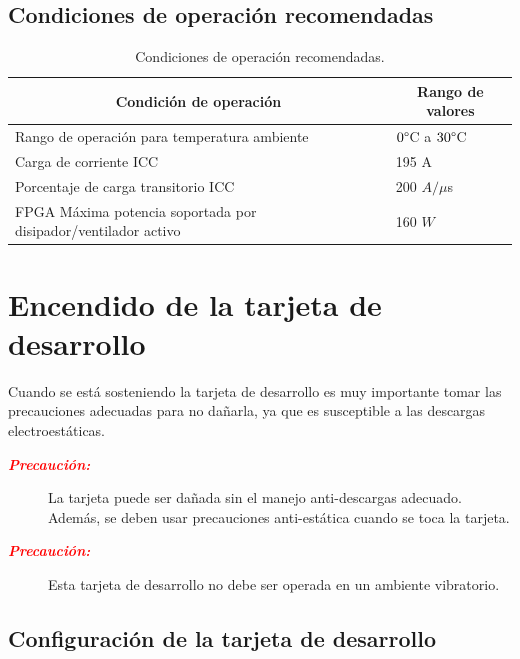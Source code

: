 \subsection{Condiciones de operaci\'on recomendadas}

\begin{table}[H]
    \centering
    \begin{tabularx}{\linewidth}{l|X}
        \toprule 
        \multicolumn{1}{c}{\textbf{Condición de operación}} & \multicolumn{1}{c}{\textbf{Rango de valores}} \\
        \toprule
        Rango de operación para temperatura ambiente & $0\degree$C a $30\degree$C \\ 
        \midrule
        Carga de corriente ICC & 195 A \\
        \midrule
        Porcentaje de carga transitorio ICC & 200 $A/\mu$s \\ 
        \midrule
        FPGA Máxima potencia soportada por disipador/ventilador activo & 160 $W$\footnotemark \\ 
        \bottomrule
    \end{tabularx}
    \caption{Condiciones de operación recomendadas.}
    \label{tab:my_label}
\end{table}



   \section{Encendido de la tarjeta de desarrollo}

   Cuando se est\'a sosteniendo la tarjeta de desarrollo es muy importante tomar las precauciones adecuadas para no dañarla, ya que es susceptible a las descargas electroest\'aticas. 

   \begin{description}
       \item[\textbf{\textit{\textcolor{red}{Precauci\'on:}}}] La tarjeta puede ser dañada sin el manejo anti-descargas adecuado. Además, se deben usar precauciones anti-est\'atica cuando se toca la tarjeta.
       \item[\textbf{\textit{\textcolor{red}{Precauci\'on:}}}] Esta tarjeta de desarrollo no debe ser operada en un ambiente vibratorio.
   \end{description}

\subsection{Configuraci\'on de la tarjeta de desarrollo}

